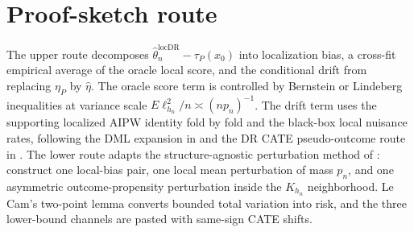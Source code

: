 \documentclass[11pt]{article}
\theoremstyle{definition}
\theoremstyle{plain}
\theoremstyle{remark}
\begin{document}
\section{Proof-sketch route}
The upper route decomposes $\hat\theta_n^{\mathrm{locDR}}-\tau_P(x_0)$ into localization bias, a cross-fit empirical average of the oracle local score, and the conditional drift from replacing $\eta_P$ by $\hat\eta$. The oracle score term is controlled by Bernstein or Lindeberg inequalities at variance scale $E\ell_{h_n}^2/n\asymp(n p_n)^{-1}$. The drift term uses the supporting localized AIPW identity fold by fold and the black-box local nuisance rates, following the DML expansion in \citet{ChernozhukovEtAl2018DML} and the DR CATE pseudo-outcome route in \citet{Kennedy2023DRCATE}. The lower route adapts the structure-agnostic perturbation method of \citet{JinSyrgkanis2024StructureAgnosticDR,JinSyrgkanis2025GeneralLinearFunctionalLowerBounds}: construct one local-bias pair, one local mean perturbation of mass $p_n$, and one asymmetric outcome-propensity perturbation inside the $K_{h_n}$ neighborhood. Le Cam's two-point lemma converts bounded total variation into risk, and the three lower-bound channels are pasted with same-sign CATE shifts.
\end{document}
